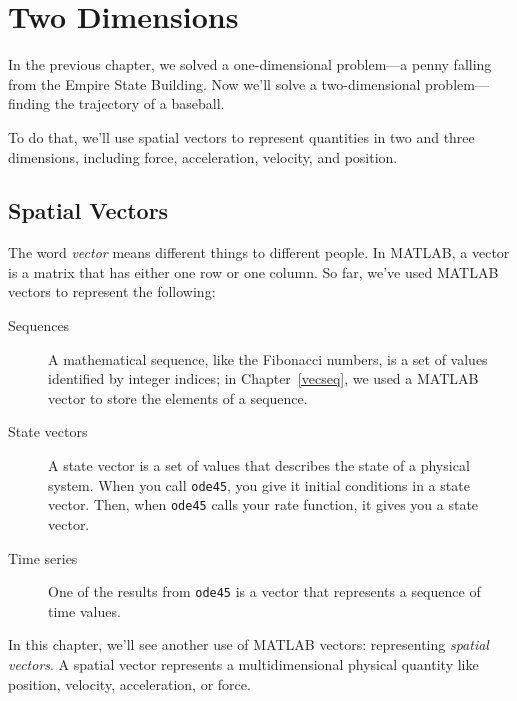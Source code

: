 \documentclass[../../book.tex]{subfiles}
\begin{document}
\chapter{Two Dimensions}

In the previous chapter, we solved a one-dimensional problem---a penny falling from the Empire State Building.  Now we'll solve a two-dimensional problem---finding the trajectory of a baseball.


To do that, we'll use spatial vectors to represent quantities in two and three dimensions, including force, acceleration, velocity, and position.

\section{Spatial Vectors}
\label{spacial}

The word \emph{vector} means different
things to different people.  In MATLAB, a vector is a matrix that has
either one row or one column.  So far, we've used MATLAB vectors to
represent the following:

\begin{description}

\item[Sequences] A mathematical sequence, like the Fibonacci numbers, is a set of values identified by integer indices; in Chapter~\ref{vecseq}, we used a MATLAB vector to store the elements of a sequence.

\item[State vectors] A state vector is a set of values that
describes the state of a physical system.  When you call
\lstinline{ode45}, you give it initial conditions in a state
vector.  Then, when \lstinline{ode45} calls your rate function, it
gives you a state vector.

\item[Time series] One of the results from \lstinline{ode45} is a vector that represents a sequence of time values.

\end{description}


In this chapter, we'll see another use of MATLAB vectors: representing
\emph{spatial vectors}.  A spatial vector represents a multidimensional physical quantity like position, velocity, acceleration, or force.
\end{document}
